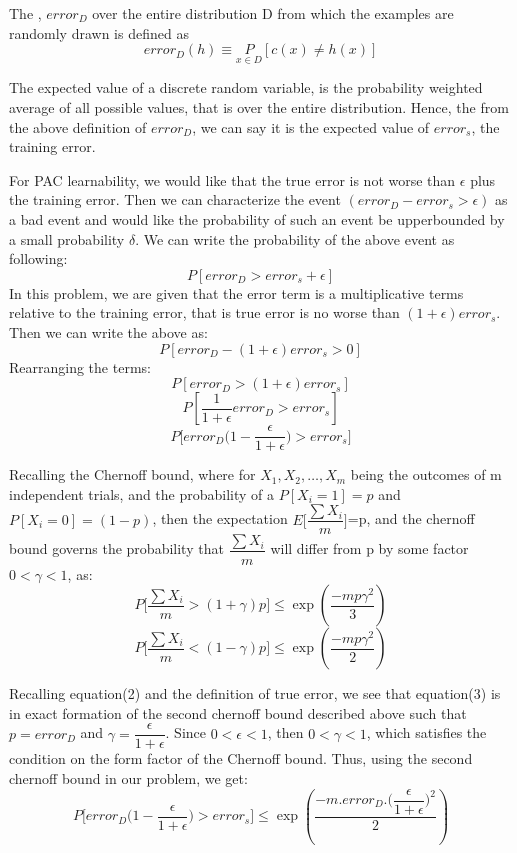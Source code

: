 \documentclass{article}
\begin{document}
  The , $error_{D}$ over the entire distribution D from which the examples are randomly drawn is defined as \newline
  \[ error_{D}(h) \equiv  \underset{x \in D}{P} [c(x) \neq h(x)]\]
    
    The expected value of a discrete random variable, is the probability weighted average of all possible values, that is over the entire distribution. Hence, the from the above definition of $error_{D}$, we can say it is the expected value of $error_{s}$, the training error.\newline
    
    For PAC learnability, we would like that the true error is not worse than $\epsilon$ plus the training error. Then we can characterize the event $(error_{D} - error_{s} > \epsilon)$ as a bad event and would like the probability of such an event be upperbounded by a small probability $\delta$. We can write the probability of the above event as following: \newline
    \[P[error_{D} > error_{s} + \epsilon]\]
    In this problem, we are given that the error term is a multiplicative terms relative to the training error, that is true error is no worse than  $(1 + \epsilon)error_{s}$. Then we can write the above as:
    \[P[error_{D} - (1+\epsilon)error_{s} > 0]\]
    Rearranging the terms:
    \[ P[error_{D} > (1+\epsilon)error_{s} ]\]
    \[ P[\dfrac{1}{1 + \epsilon}error_{D} > error_{s} ]\]
    \begin{equation}
     P\bigg [  error_{D}\bigg (  1 - \dfrac{\epsilon}{1 + \epsilon}  \bigg ) > error_{s}  \bigg ]
    \end{equation}
    
    Recalling the Chernoff bound, where for $X_{1},X_{2},\dots,X_{m}$ being the outcomes of m independent trials, and the probability of a $P[X_{i}=1]=p$ and $P[X_{i} = 0]=(1-p)$, then the expectation $E\bigg [  \dfrac{\sum X_{i}}{m}\bigg ]$=p, and the chernoff bound governs the probability that $\dfrac{\sum X_{i}}{m}$ will differ from p by some factor $0 < \gamma < 1$, as:
    \[ P\bigg [ \dfrac{\sum X_{i}}{m} > (1+\gamma)p \bigg ] \leq \exp(\dfrac{-mp\gamma^2}{3})\]
        \[ P\bigg [ \dfrac{\sum X_{i}}{m} < (1-\gamma)p \bigg ] \leq \exp(\dfrac{-mp\gamma^2}{2})\]
    
    Recalling equation(2) and the definition of true error, we see that equation(3) is in exact formation of the second chernoff bound described above such that \newline 
    $p=error_{D}$ and $\gamma = \dfrac{\epsilon}{1 + \epsilon}$. Since $0 < \epsilon < 1$, then $ 0 < \gamma < 1 $, which satisfies the condition on the form factor of the Chernoff bound. Thus, using the second chernoff bound in our problem, we get:
    \begin{equation}
    P\bigg [  error_{D}\bigg (  1 - \dfrac{\epsilon}{1 + \epsilon}  \bigg ) > error_{s}  \bigg ] \leq \exp(\dfrac{-m.error_{D}.\bigg (\dfrac{\epsilon}{1 + \epsilon}\bigg )^2}{2})
    \end{equation}
    
\end{document}
